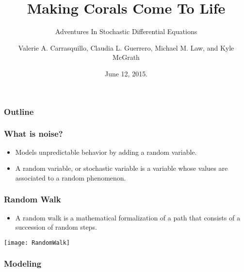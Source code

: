 \documentclass{beamer}
\begin{document}
\author{Valerie A. Carrasquillo, Claudia L. Guerrero, Michael M. Law, and Kyle McGrath}

\title{Making Corals Come To Life}
\subtitle{Adventures In Stochastic Differential Equations}
\date{June 12, 2015.}

\begin{frame}
  \titlepage
\end{frame}

\begin{frame}
  \frametitle{Outline}
  \tableofcontents
\end{frame}

\begin{frame}
  \frametitle{What is noise?}
  \begin{itemize}
  \item Models unpredictable behavior by adding a random variable.
  \item A random variable, or stochastic variable is a variable whose values are associated to a random phenomenon.
  \end{itemize}
\end{frame}

\begin{frame}
  \frametitle{Random Walk}
  \begin{itemize}
  \item A random walk is a mathematical formalization of a path that consists of a succession of random steps.
  \end{itemize}
  \centering
  \texttt{[image: RandomWalk]}
\end{frame}

\begin{frame}
  \frametitle{Modeling}
\end{frame}




\end{document}
